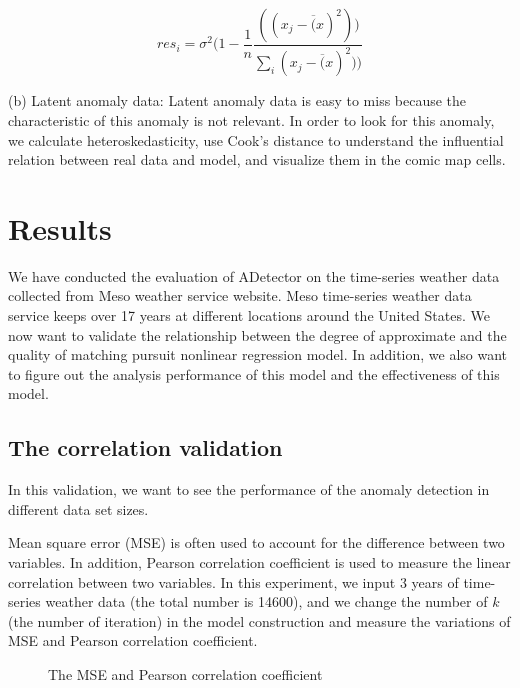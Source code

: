 \documentclass{vgtc}                          %
\begin{document}
\begin{equation}
res_i = \sigma^2 ( 1 -\frac{1}{n} \frac{((x_j - \overline(x)^2))}{\sum_i(x_j - \overline(x)^2))}
\end{equation}		 

(b) Latent anomaly data: Latent anomaly data is easy to miss because the characteristic of this anomaly is not relevant. In order to look for this anomaly, we calculate heteroskedasticity, use Cook's distance to understand the influential relation between real data and model, and visualize them in the comic map cells. 

\section{Results}

We have conducted the evaluation of ADetector on the time-series weather data collected from Meso weather service website. Meso time-series weather data service keeps over 17 years at different locations around the United States. We now want to validate the relationship between the degree of approximate and the quality of matching pursuit nonlinear regression model. In addition, we also want to figure out the analysis performance of this model and the effectiveness of this model.

\subsection{The correlation validation}

In this validation, we want to see the performance of the anomaly detection in different data set sizes. 

Mean square error (MSE) is often used to account for the difference between two variables. In addition, Pearson correlation coefficient is used to measure the linear correlation between two variables. In this experiment, we input 3 years of time-series weather data (the total number is 14600), and we change the number of $k$ (the number of iteration) in the model construction and measure the variations of MSE and Pearson correlation coefficient. 

\begin{figure}[htb]
	\caption{The MSE and Pearson correlation coefficient}
	\label{fig:MSEandPearsonCorr}
\end{figure}
\end{document}
